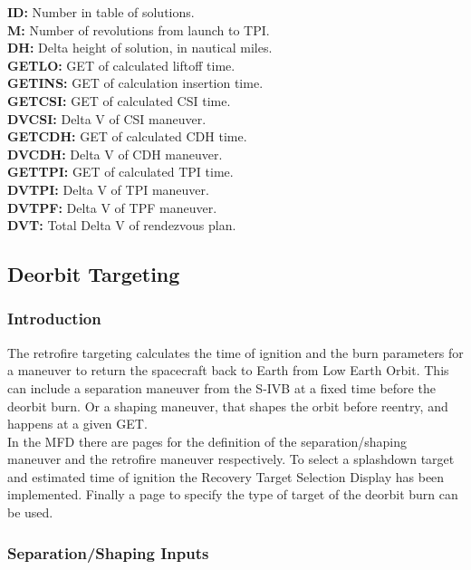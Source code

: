 \documentclass[11pt]{article} %
\begin{document}
\textbf{ID:} Number in table of solutions.\\
\textbf{M:} Number of revolutions from launch to TPI.\\
\textbf{DH:} Delta height of solution, in nautical miles.\\
\textbf{GETLO:} GET of calculated liftoff time.\\
\textbf{GETINS:} GET of calculation insertion time.\\
\textbf{GETCSI:} GET of calculated CSI time.\\
\textbf{DVCSI:} Delta V of CSI maneuver.\\
\textbf{GETCDH:} GET of calculated CDH time.\\
\textbf{DVCDH:} Delta V of CDH maneuver.\\
\textbf{GETTPI:} GET of calculated TPI time.\\
\textbf{DVTPI:} Delta V of TPI maneuver.\\
\textbf{DVTPF:} Delta V of TPF maneuver.\\
\textbf{DVT:} Total Delta V of rendezvous plan.\\

\newpage
\subsection{Deorbit Targeting}
\subsubsection{Introduction}

The retrofire targeting calculates the time of ignition and the burn parameters for a maneuver to return the spacecraft back to Earth from Low Earth Orbit. This can include a separation maneuver from the S-IVB at a fixed time before the deorbit burn. Or a shaping maneuver, that shapes the orbit before reentry, and happens at a given GET.\\

In the MFD there are pages for the definition of the separation/shaping maneuver and the retrofire maneuver respectively. To select a splashdown target and estimated time of ignition the Recovery Target Selection Display has been implemented. Finally a page to specify the type of target of the deorbit burn can be used.\\

\subsubsection{Separation/Shaping Inputs}
\end{document}
